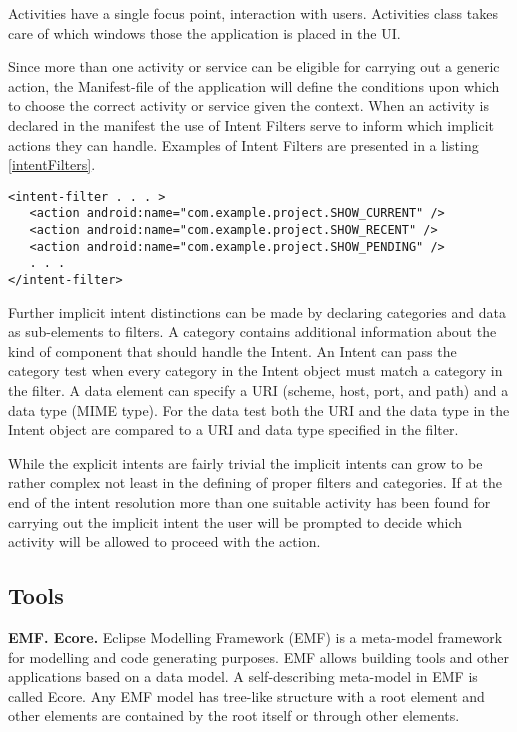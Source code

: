 Activities have a single focus point, interaction with users. Activities class takes care of which windows those the application is placed in the UI. 


Since more than one activity or service can be eligible for carrying out a generic action, the Manifest-file of the application will define the conditions upon which to choose the correct activity or service given the context. When an activity is declared in the manifest the use of Intent Filters serve to inform which implicit actions they can handle. Examples of Intent Filters are presented in a listing \ref{intentFilters}.

{\footnotesize\begin{lstlisting}[label=intentFilters,caption=Intent Filters]
<intent-filter . . . >
   <action android:name="com.example.project.SHOW_CURRENT" />
   <action android:name="com.example.project.SHOW_RECENT" />
   <action android:name="com.example.project.SHOW_PENDING" />
   . . .
</intent-filter>
\end{lstlisting}}

Further implicit intent distinctions can be made by declaring categories and data as sub-elements to filters. A category contains additional information about the kind of component that should handle the Intent. An Intent can pass the category test when every category in the Intent object must match a category in the filter. A data element can specify a URI (scheme, host, port, and path) and a data type (MIME type). For the data test both the URI and the data type in the Intent object are compared to a URI and data type specified in the filter. 

While the explicit intents are fairly trivial the implicit intents can grow to be rather complex not least in the defining of proper filters and categories. If at the end of the intent resolution more than one suitable activity has been found for carrying out the implicit intent the user will be prompted to decide which activity will be allowed to proceed with the action. 


\subsection{Tools}
\label{tools}
\textbf{EMF. Ecore.} Eclipse Modelling Framework (EMF) \cite{emf} is a meta-model framework for modelling and code generating purposes. EMF allows building tools and other applications based on a data model. A self-describing meta-model in EMF is called Ecore. Any EMF model has tree-like structure with a root element and other elements are contained by the root itself or through other elements. 

